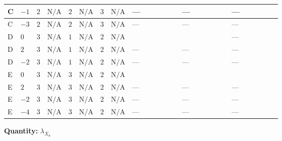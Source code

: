 \documentclass[8pt]{article}
\begin{document}
\begin{landscape}
\begin{longtable}{@{}llcccccc >{\raggedright\arraybackslash}p{0.21\linewidth} >{\raggedright\arraybackslash}p{0.21\linewidth} >{\raggedright\arraybackslash}p{0.21\linewidth}@{}}
\midrule
C & $-1$ & $2$ & $\text{N/A}$ & $2$ & $\text{N/A}$ & $3$ & $\text{N/A}$ & --- & --- & --- \\
\midrule
C & $-3$ & $2$ & $\text{N/A}$ & $2$ & $\text{N/A}$ & $3$ & $\text{N/A}$ & --- & --- & --- \\
\midrule
D & $0$ & $3$ & $\text{N/A}$ & $1$ & $\text{N/A}$ & $2$ & $\text{N/A}$ & \scriptsize\adjustbox{max width=\linewidth}{$\begin{gathered} +22 {\lambda_{S_1}^{(1)}} {\lambda_{X_{9}}}\end{gathered}$} & \scriptsize\adjustbox{max width=\linewidth}{$\begin{gathered} -24 {g_2}^2 {\lambda_{X_{9}}}\end{gathered}$} & --- \\
\midrule
D & $2$ & $3$ & $\text{N/A}$ & $1$ & $\text{N/A}$ & $2$ & $\text{N/A}$ & --- & --- & --- \\
\midrule
D & $-2$ & $3$ & $\text{N/A}$ & $1$ & $\text{N/A}$ & $2$ & $\text{N/A}$ & --- & --- & --- \\
\midrule
E & $0$ & $3$ & $\text{N/A}$ & $3$ & $\text{N/A}$ & $2$ & $\text{N/A}$ & \scriptsize\adjustbox{max width=\linewidth}{$\begin{gathered} +22 {\lambda_{S_1}^{(1)}} {\lambda_{X_{9}}}\end{gathered}$} & \scriptsize\adjustbox{max width=\linewidth}{$\begin{gathered} -24 {g_2}^2 {\lambda_{X_{9}}}\end{gathered}$} & \scriptsize\adjustbox{max width=\linewidth}{$\begin{gathered} +{\lambda_{12}^{(1)}} (6 {\lambda_{X_{5}}^{(1)}}+2 {\lambda_{X_{5}}^{(2)}})\end{gathered}$} \\
\midrule
E & $2$ & $3$ & $\text{N/A}$ & $3$ & $\text{N/A}$ & $2$ & $\text{N/A}$ & --- & --- & --- \\
\midrule
E & $-2$ & $3$ & $\text{N/A}$ & $3$ & $\text{N/A}$ & $2$ & $\text{N/A}$ & --- & --- & --- \\
\midrule
E & $-4$ & $3$ & $\text{N/A}$ & $3$ & $\text{N/A}$ & $2$ & $\text{N/A}$ & --- & --- & --- \\
\midrule
\bottomrule
\end{longtable}
\clearpage
\noindent\textbf{Quantity: }${\lambda_{X_{9}}}$\par\smallskip

\end{landscape}
\end{document}
